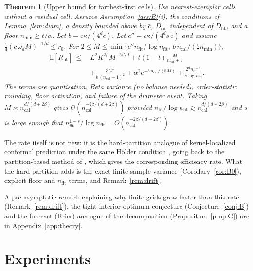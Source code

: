 \documentclass[11pt]{article}
\newtheorem{theorem}{Theorem}
\theoremstyle{definition}
\theoremstyle{remark}
\newcommand{\Dfit}{D_{\mathrm{fit}}}
\newcommand{\Dcal}{D_{\mathrm{cal}}}
\newcommand{\E}{\mathbb{E}}
\newcommand{\1}{\mathbf{1}}
\begin{document}
\begin{theorem}[Upper bound for farthest-first cells]
\label{thm:B}
Use nearest-exemplar cells without a residual cell. Assume Assumption~\ref{ass:B}(i), the conditions of Lemma~\ref{lem:diam}, a density bounded
above by $\bar c$, $\Dcal$ independent of $\Dfit$, and a floor $n_{\min}\ge t/\alpha$. Let
$b=c\kappa/(4^d\bar c)$. Let $c''=c\kappa/(4^d s\,\bar c)$ and assume $\tfrac14(\bar c\,\omega_d M)^{-1/d}\le r_0$. For
$2\le M\le\min\{c''n_{\mathrm{fit}}/\log n_{\mathrm{fit}},\
b\,n_{\mathrm{cal}}/(2n_{\min})\}$,
\begin{align*}
  \E[R_{\mathrm{pt}}]\ \le\ &L^2K^{2\beta}M^{-2\beta/d} + t(1-t)\frac{M}{n_{\mathrm{cal}}+1}\\
  &+ \frac{3M^2}{b\,(n_{\mathrm{cal}}+1)^2} + \alpha^2 e^{-b\,n_{\mathrm{cal}}/(8M)}
  + \frac{2^d n_{\mathrm{fit}}^{1-s}}{s\log n_{\mathrm{fit}}}.
\end{align*}
The terms are quantisation, Beta variance (no balance needed), order-statistic rounding, floor
activation, and failure of the diameter event. Taking $M\asymp n_{\mathrm{cal}}^{d/(d+2\beta)}$ gives
$O(n_{\mathrm{cal}}^{-2\beta/(d+2\beta)})$ provided $n_{\mathrm{fit}}/\log n_{\mathrm{fit}}\gtrsim
n_{\mathrm{cal}}^{d/(d+2\beta)}$ and $s$ is large enough that $n_{\mathrm{fit}}^{1-s}/\log n_{\mathrm{fit}}=
O(n_{\mathrm{cal}}^{-2\beta/(d+2\beta)})$.
\end{theorem}

The rate itself is not new: it is the hard-partition analogue of kernel-localized conformal
prediction under the same H\"older condition \citep{conrad2026beyond,min2026unified}, going back to
the partition-based method of \citet{lei2014distribution}, which gives the corresponding efficiency rate. What the hard partition adds is the
exact finite-sample variance (Corollary~\ref{cor:B0}), explicit floor and $n_{\mathrm{fit}}$ terms, and
Remark~\ref{rem:drift}.

A pre-asymptotic remark explaining why finite grids grow faster than this rate (Remark~\ref{rem:drift}),
the tight interior-optimum conjecture (Conjecture~\ref{conj:B}) and the forecast (Brier) analogue of the
decomposition (Proposition~\ref{prop:G}) are in Appendix~\ref{app:theory}.


\section{Experiments}
\label{sec:experiments}
\end{document}
